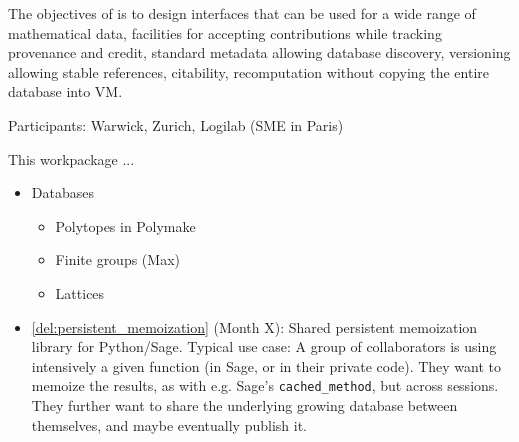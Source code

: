\addtocounter{wpno}{1}
\begin{Workpackage}{\thewpno}
\WPTitle{\wpname{\thewpno}}

\begin{WPObjectives}
  The objectives of \theWP{} is to design interfaces that can be used
  for a wide range of mathematical data, facilities for accepting
  contributions while tracking provenance and credit, standard
  metadata allowing database discovery, versioning allowing stable
  references, citability, recomputation without copying the entire
  database into VM.

  Participants: Warwick, Zurich, Logilab (SME in Paris)
\end{WPObjectives}

\begin{WPDescription}
This workpackage  ...
\end{WPDescription}

\begin{WPDeliverables}
\begin{itemize}
\item Databases
  \begin{itemize}
  \item Polytopes in Polymake
  \item Finite groups (Max)
  \item Lattices
  \end{itemize}
\item \ref{del:persistent_memoization} (Month X): Shared persistent
  memoization library for Python/Sage.  Typical use case: A group of
  collaborators is using intensively a given function (in Sage, or in
  their private code). They want to memoize the results, as with
  e.g. Sage's \lstinline{cached_method}, but across sessions.  They
  further want to share the underlying growing database between
  themselves, and maybe eventually publish it.


\end{itemize}
\end{WPDeliverables}
\end{Workpackage}

